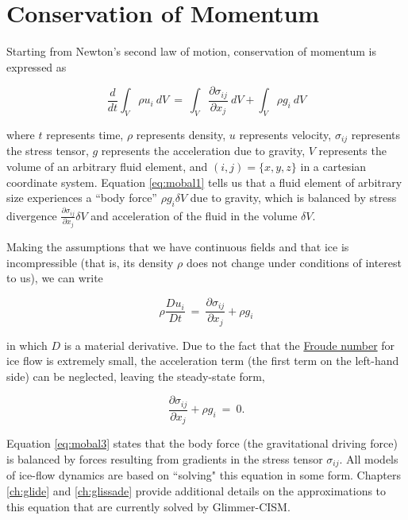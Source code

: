 \section{Conservation of Momentum}

Starting from Newton's second law of motion, conservation of momentum is expressed as

\begin{equation}
\frac{d} {dt} \int_{V}\rho u_{i}~dV ~ = ~ \int_{V} \frac{\partial \sigma_{ij}} {\partial x_{j}} ~dV +  \int_{V} \rho g_{i}~dV
\label{eq:mobal1}
\end{equation}

where $t$ represents time, $\rho$ represents density, $u$ represents
velocity, $\sigma_{ij}$ represents the stress tensor, $g$ represents the
acceleration due to gravity, $V$ represents the volume of an arbitrary
fluid element, and $(i,j)= \{x, y, z\}$ in a cartesian coordinate
system. Equation \eqref{eq:mobal1} tells us that a fluid element of arbitrary size 
experiences a ``body force'' $\rho g_{i}\delta V$ due to gravity, which is balanced by 
stress divergence $\frac{\partial \sigma_{ij}} {\partial x_{j}} \delta V$ and acceleration
of the fluid in the volume $\delta V$. 

Making the assumptions that we have continuous fields and that ice is incompressible (that is, 
its density $\rho$ does not change under conditions of interest to us), we can write

\begin{equation}
\rho \frac{D u_{i}}{D t}~=~\frac{\partial \sigma_{ij}}{\partial x_{j}} + \rho g_{i}
\label{eq:mobal2}
\end{equation}

in which $D$ is a material derivative. Due to the fact that the \href{http://en.wikipedia.org/wiki/Froude_number}
{Froude number} for ice flow is extremely small, the acceleration term (the first term on the left-hand side) can be 
neglected, leaving the steady-state form, 

\begin{equation}
\frac{\partial \sigma_{ij}}{\partial x_{j}} + \rho g_{i} ~=~0.
\label{eq:mobal3}
\end{equation}

Equation \eqref{eq:mobal3} states that the body force (the gravitational driving force) is balanced by forces resulting from 
gradients in the stress tensor $\sigma_{ij}$. All models of ice-flow dynamics are based on ``solving" this equation in some form.
Chapters \ref{ch:glide} and \ref{ch:glissade} provide additional details on the approximations to this equation that are currently 
solved by Glimmer-CISM.

